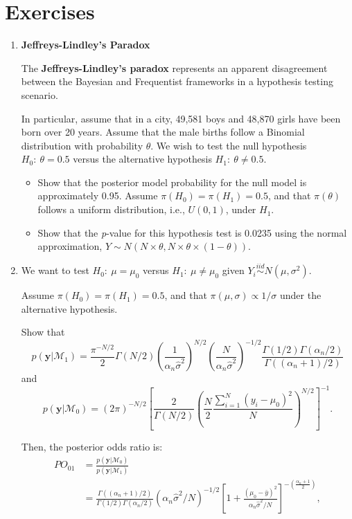 \section{Exercises}\label{sec28}
\begin{enumerate}
	\item \textbf{Jeffreys-Lindley's Paradox}
	
	The \textbf{Jeffreys-Lindley's paradox} \cite{Jeffreys1961,lindley1957statistical} represents an apparent disagreement between the Bayesian and Frequentist frameworks in a hypothesis testing scenario.
	
	In particular, assume that in a city, 49,581 boys and 48,870 girls have been born over 20 years. Assume that the male births follow a Binomial distribution with probability $\theta$. We wish to test the null hypothesis $H_0: \ \theta = 0.5$ versus the alternative hypothesis $H_1: \ \theta \neq 0.5$.
	
	\begin{itemize}
		\item Show that the posterior model probability for the null model is approximately 0.95. Assume $\pi(H_0) = \pi(H_1) = 0.5$, and that $\pi(\theta)$ follows a uniform distribution, i.e., ${U}(0,1)$, under $H_1$.
		\item Show that the \textit{p}-value for this hypothesis test is 0.0235 using the normal approximation, $Y \sim N(N \times \theta, N \times \theta \times (1 - \theta))$.
	\end{itemize}
	
	\item We want to test $H_0: \ \mu = \mu_0$ versus $H_1: \ \mu \neq \mu_0$ given $Y_i \stackrel{iid}{\sim} N(\mu, \sigma^2)$.
	
	Assume $\pi(H_0) = \pi(H_1) = 0.5$, and that $\pi(\mu, \sigma) \propto 1/\sigma$ under the alternative hypothesis.
	
	Show that	
	\[
	p(\mathbf{y}|\mathcal{M}_1) = \frac{\pi^{-N/2}}{2} \Gamma(N/2) \left( \frac{1}{\alpha_n \hat{\sigma}^2} \right)^{N/2} \left( \frac{N}{\alpha_n \hat{\sigma}^2} \right)^{-1/2} \frac{\Gamma(1/2) \Gamma(\alpha_n/2)}{\Gamma((\alpha_n+1)/2)}
	\]
	and 
	\[
	p(\mathbf{y}|\mathcal{M}_0) = (2\pi)^{-N/2} \left[ \frac{2}{\Gamma(N/2)} \left( \frac{N}{2} \frac{\sum_{i=1}^N (y_i - \mu_0)^2}{N} \right)^{N/2} \right]^{-1}.
	\]
	
	Then, the posterior odds ratio is:	
	\begin{align*}
		PO_{01} &= \frac{p(\mathbf{y}|\mathcal{M}_0)}{p(\mathbf{y}|\mathcal{M}_1)} \\
		&= \frac{\Gamma((\alpha_n+1)/2)}{\Gamma(1/2)\Gamma(\alpha_n/2)} (\alpha_n \hat{\sigma}^2 / N)^{-1/2} \left[ 1 + \frac{(\mu_0 - \bar{y})^2}{\alpha_n \hat{\sigma}^2 / N} \right]^{-\left(\frac{\alpha_n + 1}{2}\right)},
	\end{align*}
	

\end{enumerate}
